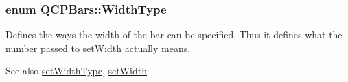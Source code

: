 \subsubsection[{\texorpdfstring{Width\+Type}{WidthType}}]{\setlength{\rightskip}{0pt plus 5cm}enum {\bf Q\+C\+P\+Bars\+::\+Width\+Type}}\hypertarget{class_q_c_p_bars_a65dbbf1ab41cbe993d71521096ed4649}{}\label{class_q_c_p_bars_a65dbbf1ab41cbe993d71521096ed4649}
Defines the ways the width of the bar can be specified. Thus it defines what the number passed to \hyperlink{class_q_c_p_bars_afec6116579d44d5b706e0fa5e5332507}{set\+Width} actually means.

\begin{DoxySeeAlso}{See also}
\hyperlink{class_q_c_p_bars_adcaa3b41281bb2c0f7949b341592fcc0}{set\+Width\+Type}, \hyperlink{class_q_c_p_bars_afec6116579d44d5b706e0fa5e5332507}{set\+Width} 
\end{DoxySeeAlso}
